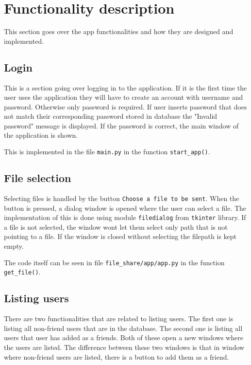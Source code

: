 \section{Functionality description}
This section goes over the app functionalities and how they are designed and implemented.

\subsection{Login}
This is a section going over logging in to the application. If it is the first time the user uses the application they will have to create an account with username
and password. Otherwise only password is required. If user inserts password that does not match their corresponding password stored in database the 
"Invalid password" message is displayed. If the password is correct, the main window of the application is shown.

This is implemented in the file \texttt{main.py} in the function \texttt{start\_app()}.

\subsection{File selection}
Selecting files is handled by the button \texttt{Choose a file to be sent}. When the button is pressed, a dialog window is opened where the user can select
a file. The implementation of this is done using module \texttt{filedialog} from \texttt{tkinter} library. If a file is not selected, the window wont let them
select only path that is not pointing to a file. If the window is closed without selecting the filepath is kept empty.

The code itself can be seen in file \texttt{file\_share/app/app.py} in the function \texttt{get\_file()}.

\subsection{Listing users}
There are two functionalities that are related to listing users. The first one is listing all non-friend users that are in the database. The second one 
is listing all users that user has added as a friends. Both of these open a new windows where the users are listed. The difference between these two windows
is that in window where non-friend users are listed, there is a button to add them as a friend.

